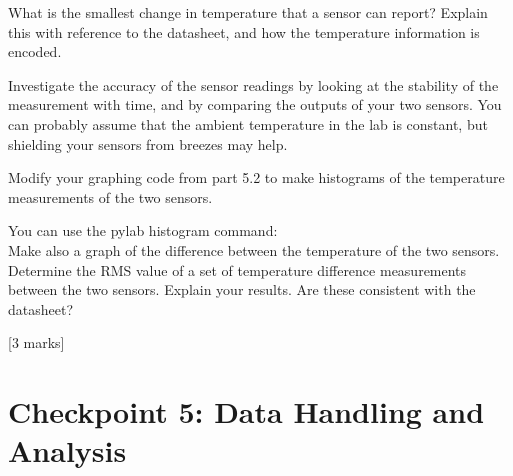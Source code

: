 \begin{enumerate}
What is the smallest change in temperature that a sensor can report? Explain this with reference to the datasheet, and how the temperature information is encoded.

Investigate the accuracy of the sensor readings by looking at the stability of the measurement with time, and by comparing the outputs of your two sensors. You can probably assume that the ambient temperature in the lab is constant, but shielding your sensors from breezes may help.

Modify your graphing code from part 5.2 to make histograms of the temperature measurements of the two sensors. 

You can use the pylab histogram command:\\

Make also a graph of the difference between the temperature of the two sensors. Determine the RMS value of a set of temperature difference measurements between the two sensors. Explain your results. Are these consistent with the datasheet?

\hfill [3 marks]


\end{enumerate}


\newpage
\section{Checkpoint 5: Data Handling and Analysis}

